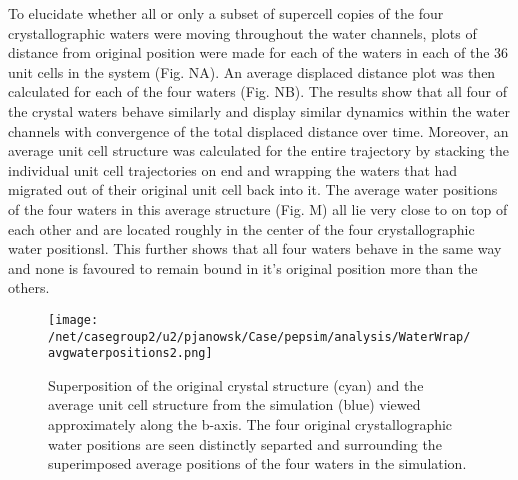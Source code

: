 \documentclass[12pt,letterpaper]{report}
\begin{document}
\begin{enumerate}
To elucidate whether all or only a subset of supercell copies of the four crystallographic waters were moving throughout the water channels, plots of distance from original position were made for each of the waters in each of the 36 unit cells in the system (Fig. NA). An average displaced distance plot was then calculated for each of the four waters (Fig. NB). The results show that all four of the crystal waters behave similarly and display similar dynamics within the water channels with convergence of the total displaced distance over time. Moreover, an average unit cell structure was calculated for the entire trajectory by stacking the individual unit cell trajectories on end and wrapping the waters that had migrated out of their original unit cell back into it. The average water positions of the four waters in this average structure (Fig. M) all lie very close to on top of each other and are located roughly in the center of the four crystallographic water positionsl. This further shows that all four waters behave in the same way and none is favoured to remain bound in it's original position more than the others.

	\begin{figure}[H]
	\centering
	\setcounter{subfigure}{0}
	\end{figure}

	\begin{figure}[H]
	\centering
	\texttt{[image: /net/casegroup2/u2/pjanowsk/Case/pepsim/analysis/WaterWrap/avgwaterpositions2.png]}
	\caption{Superposition of the original crystal structure (cyan) and the average unit cell structure from the simulation (blue) viewed approximately along the b-axis. The four original crystallographic water positions are seen distinctly separted and surrounding the superimposed average positions of the four waters in the simulation.}
	\end{figure}


\end{enumerate}
\end{document}
